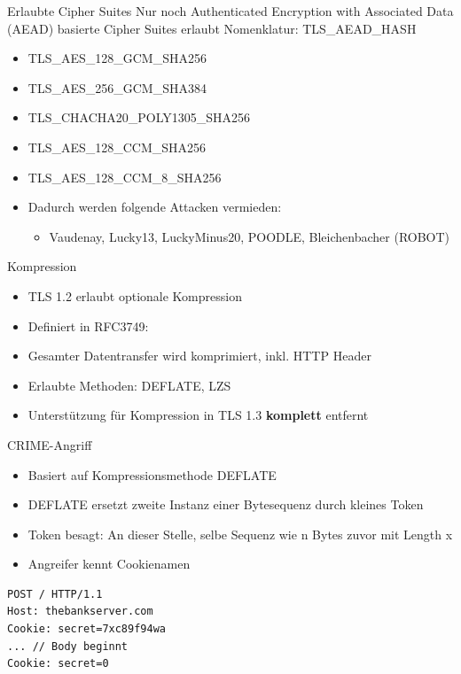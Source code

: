 \documentclass{f4_beamer_metropolis}
\begin{document}
\begin{frame}{Erlaubte Cipher Suites}
Nur noch Authenticated Encryption with Associated Data (AEAD) basierte Cipher Suites erlaubt
Nomenklatur: TLS\_AEAD\_HASH
  \begin{itemize}
    \item TLS\_AES\_128\_GCM\_SHA256
    \item TLS\_AES\_256\_GCM\_SHA384
    \item TLS\_CHACHA20\_POLY1305\_SHA256
    \item TLS\_AES\_128\_CCM\_SHA256
    \item TLS\_AES\_128\_CCM\_8\_SHA256
  \end{itemize}

\begin{itemize}
  \item Dadurch werden folgende Attacken vermieden:
  \begin{itemize}
    \item Vaudenay, Lucky13, LuckyMinus20, POODLE, Bleichenbacher (ROBOT)
  \end{itemize}
\end{itemize}
\end{frame}

\begin{frame}{Kompression}
\begin{itemize}
  \item TLS 1.2 erlaubt optionale Kompression
  \item Definiert in RFC3749: 
  \item Gesamter Datentransfer wird komprimiert, inkl. HTTP Header
  \item Erlaubte Methoden: DEFLATE, LZS
  \item Unterstützung für Kompression in TLS 1.3 \textbf{komplett} entfernt
\end{itemize}
\end{frame}

\begin{frame}[fragile]{CRIME-Angriff}
\begin{itemize}
  \item Basiert auf Kompressionsmethode DEFLATE
  \item DEFLATE ersetzt zweite Instanz einer Bytesequenz durch kleines Token
  \item Token besagt: An dieser Stelle, selbe Sequenz wie n Bytes zuvor mit Length x
  \item Angreifer kennt Cookienamen
\end{itemize}
\begin{lstlisting}[frame=single]
POST / HTTP/1.1
Host: thebankserver.com
Cookie: secret=7xc89f94wa
... // Body beginnt
Cookie: secret=0
\end{lstlisting}
\end{frame}
\end{document}
